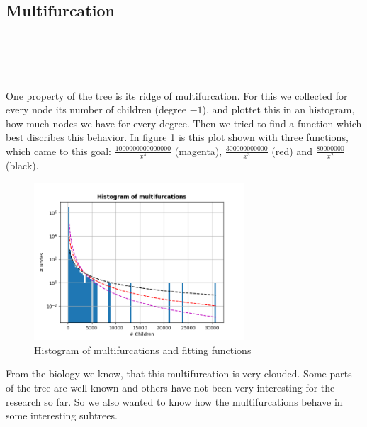       

    \subsection{Multifurcation}
       \\
       \\
       \\
       \\
      One property of the tree is its ridge of multifurcation. For this we collected for every node its
        number of children (degree $-1$), and plottet this in an histogram, how much nodes we have for 
        every degree. Then we tried to find a function which best discribes this behavior. In figure 
        \ref{fig:HistogramsOfMultifurcations} is this plot shown with three functions, which came 
         to this goal: $\frac{1000000000000000}{x^4}$ (magenta), 
        $\frac{300000000000}{x^3}$ (red) and $\frac{80000000}{x^2}$ (black). \\
      \begin{figure}[h]
        \caption{Histogram of multifurcations and fitting functions}
        \centering
        \label{fig:HistogramsOfMultifurcations}
        \includegraphics[width=0.7\textwidth]{Figures/HistogramsOfMultifurcations.png}
      \end{figure}
      From the biology we know, that this multifurcation is very clouded. Some parts of the tree are 
        well known and others have not been very interesting for the research so far. So we also wanted 
        to know how the multifurcations behave in some interesting subtrees. \\
       \\
       \\
       \\

